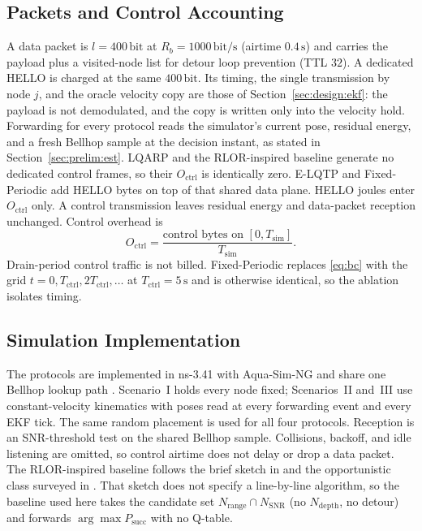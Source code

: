 \subsection{Packets and Control Accounting}
\label{sec:design:pkt}
A data packet is $l=400\,\mathrm{bit}$ at $R_b=1000\,\mathrm{bit/s}$
(airtime $0.4\,\mathrm{s}$) and carries the payload plus a
visited-node list for detour loop prevention (TTL $32$).
A dedicated HELLO is charged at the same $400\,\mathrm{bit}$.
Its timing, the single transmission by node $j$, and the oracle
velocity copy are those of Section~\ref{sec:design:ekf}: the payload
is not demodulated, and the copy is written only into the velocity
hold.
Forwarding for every protocol reads the simulator's current pose,
residual energy, and a fresh Bellhop sample at the decision
instant, as stated in Section~\ref{sec:prelim:est}.
LQARP and the RLOR-inspired baseline generate no dedicated control
frames, so their $O_{\mathrm{ctrl}}$ is identically zero.
E-LQTP and Fixed-Periodic add HELLO bytes on top of that shared
data plane.
HELLO joules enter $O_{\mathrm{ctrl}}$ only.
A control transmission leaves residual energy and data-packet
reception unchanged.
Control overhead is
\begin{equation}
\label{eq:octrl}
O_{\mathrm{ctrl}}
= \frac{\text{control bytes on }[0,T_{\mathrm{sim}}]}{T_{\mathrm{sim}}}.
\end{equation}
Drain-period control traffic is not billed.
Fixed-Periodic replaces \eqref{eq:bc} with the grid
$t=0,T_{\mathrm{ctrl}},2T_{\mathrm{ctrl}},\ldots$ at
$T_{\mathrm{ctrl}}=5\,\mathrm{s}$ and is otherwise identical, so
the ablation isolates timing.

\subsection{Simulation Implementation}
\label{sec:design:ns3}
The protocols are implemented in ns-3.41 with Aqua-Sim-NG and share
one Bellhop lookup path \cite{liu2026lqarp}.
Scenario~I holds every node fixed; Scenarios~II and~III use
constant-velocity kinematics with poses read at every forwarding
event and every EKF tick.
The same random placement is used for all four protocols.
Reception is an SNR-threshold test on the shared Bellhop sample.
Collisions, backoff, and idle listening are omitted, so control
airtime does not delay or drop a data packet.
The RLOR-inspired baseline follows the brief sketch in
\cite{liu2026lqarp} and the opportunistic class surveyed in
\cite{jiang2023orsurvey}.
That sketch does not specify a line-by-line algorithm, so the
baseline used here takes the candidate set
$N_{\mathrm{range}}\cap N_{\mathrm{SNR}}$ (no $N_{\mathrm{depth}}$,
no detour) and forwards
$\arg\max P_{\mathrm{succ}}$ with no Q-table.
\FloatBarrier
